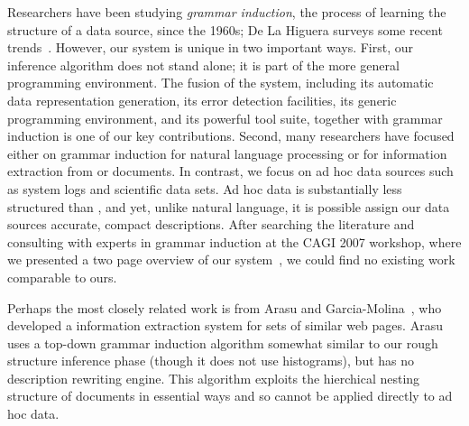 Researchers have been studying {\em grammar induction}, the process of
learning the structure of a data source, since the 1960s; De La Higuera
surveys some recent trends~\cite{higuera01current}.  However,
our system is unique in two important ways.  First, our inference
algorithm does not stand alone; it is part of the more general \pads{}
programming environment.  The fusion of the
\pads{} system, including its automatic data representation generation,
its error detection facilities, its generic programming environment, 
and its powerful tool suite, together with grammar induction
is one of our key contributions.  Second, many researchers have
focused either on grammar induction for natural language processing or
for information extraction from \xml{} or \html{} documents.  In
contrast, we focus on ad hoc data sources such as system logs and
scientific data sets. Ad hoc data is substantially less
structured than \xml{}, and yet, unlike natural language, it is
possible assign our data sources accurate, compact descriptions. After
searching the literature and consulting
with experts in grammar induction at the CAGI 2007
workshop, where we presented a two page overview of our system~\cite{burke+:cagi07},
we could find no existing work comparable to ours.


Perhaps the most closely related work is from Arasu and 
Garcia-Molina~\cite{arasu+:sigmod03}, who developed a information
extraction system for sets of similar web pages.  
Arasu uses a top-down grammar induction
algorithm somewhat similar to our rough structure inference phase
(though it does not use histograms),
but has no description rewriting engine.  
This algorithm exploits the hierchical nesting
structure of \xml{} documents in essential ways
and so cannot be applied directly to ad hoc data.  

